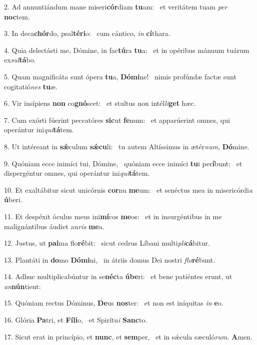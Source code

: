 2. Ad annuntiándum mane miseri\textbf{cór}diam \textbf{tu}am: \ast\  et veritátem tuam \textit{per} \textbf{noc}tem.\

3. In deca\textbf{chór}do, psal\textbf{té}\textbf{ri}o: \ast\  cum cántico, \textit{in} \textbf{cí}thara.\

4. Quia delectásti me, Dómine, in fac\textbf{tú}ra \textbf{tu}a: \ast\  et in opéribus mánuum tuárum ex\textit{sul}\textbf{tá}bo.\

5. Quam magnificáta sunt ópera \textbf{tu}a, \textbf{Dó}\textbf{mi}ne! \ast\  nimis profúndæ factæ sunt cogitatió\textit{nes} \textbf{tu}æ.\

6. Vir insípiens \textbf{non} co\textbf{gnó}scet: \ast\  et stultus non intél\textit{li}\textbf{get} hæc.\

7. Cum exórti fúerint peccatóres \textbf{sic}ut \textbf{fe}num: \ast\  et apparúerint omnes, qui operántur ini\textit{qui}\textbf{tá}tem.\

8. Ut intéreant in \textbf{sǽ}culum \textbf{sǽ}\textbf{cu}li: \ast\  tu autem Altíssimus in ætér\textit{num}, \textbf{Dó}mine.\

9. Quóniam ecce inimíci tui, Dómine, \dag\  quóniam ecce inimíci \textbf{tu}i per\textbf{í}bunt: \ast\  et dispergéntur omnes, qui operántur ini\textit{qui}\textbf{tá}tem.\

10. Et exaltábitur sicut unicórnis \textbf{cor}nu \textbf{me}um: \ast\  et senéctus mea in misericórdi\textit{a} \textbf{ú}beri.\

11. Et despéxit óculus meus ini\textbf{mí}cos \textbf{me}os: \ast\  et in insurgéntibus in me malignántibus áudiet au\textit{ris} \textbf{me}a.\

12. Justus, ut \textbf{pal}ma flo\textbf{ré}bit: \ast\  sicut cedrus Líbani multi\textit{pli}\textbf{cá}bitur.\

13. Plantáti in \textbf{do}mo \textbf{Dó}\textbf{mi}ni, \ast\  in átriis domus Dei nostri \textit{flo}\textbf{ré}bunt.\

14. Adhuc multiplicabúntur in se\textbf{néc}ta \textbf{ú}\textbf{be}ri: \ast\  et bene patiéntes erunt, ut \textit{an}\textbf{nún}tient:\

15. Quóniam rectus Dóminus, \textbf{De}us \textbf{nos}ter: \ast\  et non est iníquitas \textit{in} \textbf{e}o.\

16. Glória \textbf{Pa}tri, et \textbf{Fí}\textbf{li}o, \ast\  et Spirítu\textit{i} \textbf{Sanc}to.\

17. Sicut erat in princípio, et \textbf{nunc}, et \textbf{sem}per, \ast\  et in sǽcula sæculó\textit{rum}. \textbf{A}men.\

